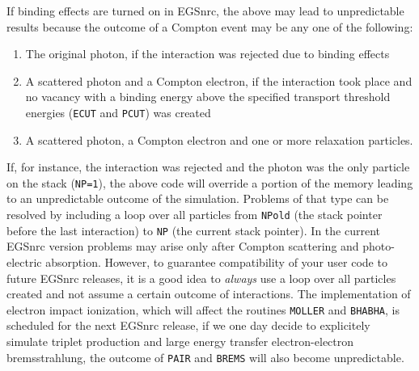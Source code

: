 \noindent
If binding effects are turned on in EGSnrc, the
above may lead to unpredictable results because the
outcome of a Compton event may be any one of the
following:
\begin{enumerate}
\item
The original photon, if the interaction was rejected
due to binding effects
\item
A scattered photon and a Compton electron, if the
interaction took place and no vacancy with a binding
energy above the specified transport threshold energies
({\tt ECUT} and {\tt PCUT}) was created
\item
A scattered photon, a Compton electron and one or more
relaxation particles.
\end{enumerate}
If, for instance, the interaction was rejected and the photon
was the only particle on the stack ({\tt NP=1}), the
above code will override a portion of the memory
leading to an unpredictable outcome of the simulation.
Problems of that type can be resolved by including
a loop over all particles from {\tt NPold} (the stack pointer
before the last interaction) to {\tt NP} (the current stack
pointer). In the current EGSnrc version problems may arise
only after Compton scattering and photo-electric absorption.
However, to guarantee compatibility of your user code
to future EGSnrc releases, it is a good idea to
{\em always} use a loop over all particles created
and not assume a certain outcome of interactions.
The implementation of electron impact ionization, which
will affect the routines {\tt MOLLER} and {\tt BHABHA}, is scheduled
for the next EGSnrc release,
if we one day decide to explicitely simulate triplet
production and large energy transfer electron-electron bremsstrahlung,
the outcome of {\tt PAIR} and {\tt BREMS} will also become unpredictable.

